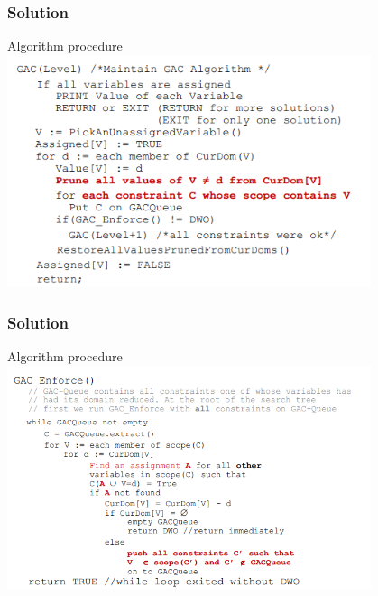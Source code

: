 \documentclass{beamer}
\begin{document}
\begin{frame} 
  \frametitle{Solution}
  Algorithm procedure
  \includegraphics[width=0.8\textwidth]{Pic/gac1}
\end{frame}

\begin{frame}
  \frametitle{Solution}
  Algorithm procedure
  \includegraphics[width=0.8\textwidth]{Pic/gac2}
\end{frame}
\end{document}
